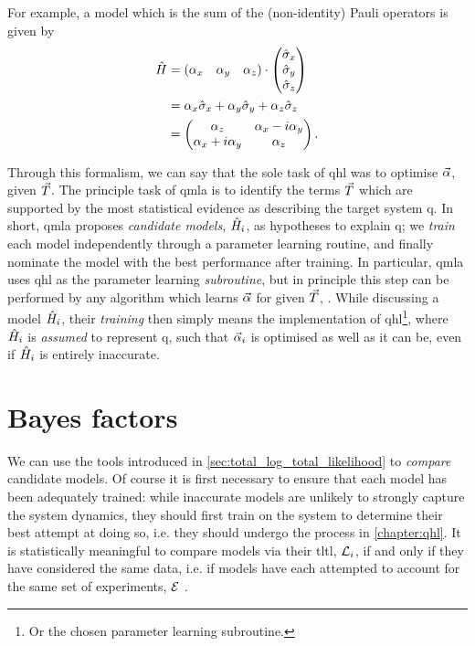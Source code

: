 For example, a model which is the sum of the (non-identity) Pauli operators is given by
\begin{align}
    \label{eqn:pauli_sum_model}
    \begin{split}
        \hat{H} &= \begin{matrix}(\alpha_x & \alpha_y & \alpha_z)\end{matrix} \cdot \left(\begin{matrix}\hat{\sigma}_{x} \\ \hat{\sigma}_{y} \\ \hat{\sigma}_{z}\end{matrix}\right) \\
        &= \alpha_x \hat{\sigma}_{x} + \alpha_y \hat{\sigma}_{y} + \alpha_z \hat{\sigma}_{z} \\
        &= \begin{pmatrix}
            \alpha_z & \alpha_x - i \alpha_y \\
            \alpha_x + i\alpha_y & \alpha_z
        \end{pmatrix}.
    \end{split}
\end{align}
\par 

Through this formalism, we can say that the sole task of \gls{qhl} was to optimise $\vec{\alpha}$, given ${ \vec{T} }$. 
The principle task of \gls{qmla} is to identify the terms ${ \vec{T} }$ 
    which are supported by the most statistical evidence as describing the target system \gls{q}. 
In short, \gls{qmla} proposes \emph{candidate models}, $\hat{H}_i$, as hypotheses to explain \gls{q}; 
    we \emph{train} each model independently through a parameter learning routine, 
    and finally nominate the model with the best performance after training. 
In particular, \gls{qmla} uses \gls{qhl} as the parameter learning \emph{subroutine}, 
    but in principle this step can be performed by any algorithm which learns $\vec{\alpha}$ for given ${ \vec{T} }$, 
    \cite{wang2015hamiltonian, krastanov2019stochastic, flurin2020using, niu2019learning, 
    greplova2017quantum, lokhov2018optimal, acampora2019evolutionary, burgarth2017evolution, valenti2021scalable}. 
While discussing a model $\hat{H}_i$, their \emph{training} then simply means the implementation 
    of \gls{qhl}\footnote{Or the chosen parameter learning subroutine.}, 
    where $\hat{H}_i$ is \emph{assumed} to represent \gls{q}, 
    such that $\vec{\alpha}_i$ is optimised as well as it can be, 
    even if $\hat{H}_i$ is entirely inaccurate. 

\section{Bayes factors}\label{sec:bayes_factors}
We can use the tools introduced in \cref{sec:total_log_total_likelihood} to \emph{compare} candidate models. 
Of course it is first necessary to ensure that each model has  
    been adequately trained: while inaccurate models are unlikely to strongly 
    capture the system dynamics, they should first train on the system 
    to determine their best attempt at doing so, 
    i.e. they should undergo the process in \cref{chapter:qhl}.
It is statistically meaningful to compare models via their \gls{tltl}, ${\mathcal{L}}_i$, 
    if and only if they have considered the same data, 
    i.e. if models have each attempted to account for the same set of \glspl{experiment}, ${ \mathcal{E} }$ \cite{kass1995bayes}.
\par 

